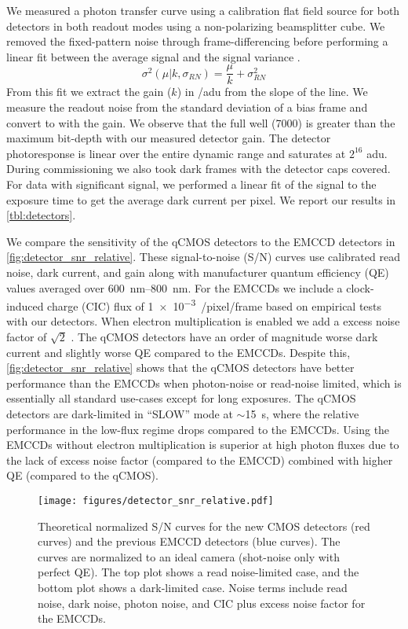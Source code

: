 We measured a photon transfer curve using a calibration flat field source for both detectors in both readout modes using a non-polarizing beamsplitter cube. We removed the fixed-pattern noise through frame-differencing before performing a linear fit between the average signal and the signal variance \citep{stefanov_cmos_2022}. 
\begin{equation}
    \sigma^2\left(\mu | k, \sigma_{RN}\right) = \frac{\mu}{k} + \sigma^2_{RN}
\end{equation}
From this fit we extract the gain ($k$) in \si{\electron/adu} from the slope of the line. We measure the readout noise from the standard deviation of a bias frame and convert to \si{\electron} with the gain. We observe that the full well (\SI{7000}{\electron}) is greater than the maximum bit-depth with our measured detector gain. The detector photoresponse is linear over the entire dynamic range and saturates at $2^{16}$ \si{adu}. During commissioning we also took dark frames with the detector caps covered. For data with significant signal, we performed a linear fit of the signal to the exposure time to get the average dark current per pixel. We report our results in \autoref{tbl:detectors}.

We compare the sensitivity of the qCMOS detectors to the EMCCD detectors in \autoref{fig:detector_snr_relative}. These signal-to-noise (S/N) curves use calibrated read noise, dark current, and gain along with manufacturer quantum efficiency (QE) values averaged over \SIrange{600}{800}{nm}. For the EMCCDs we include a clock-induced charge (CIC) flux of \SI{1e-3}{\electron/pixel/frame} based on empirical tests with our detectors. When electron multiplication is enabled we add a excess noise factor of $\sqrt{2}$ \citep{harpsoe_bayesian_2012}. The qCMOS detectors have an order of magnitude worse dark current and slightly worse QE compared to the EMCCDs. Despite this, \autoref{fig:detector_snr_relative} shows that the qCMOS detectors have better performance than the EMCCDs when photon-noise or read-noise limited, which is essentially all standard use-cases except for long exposures. The qCMOS detectors are dark-limited in ``SLOW'' mode at $\sim$\SI{15}{s}, where the relative performance in the low-flux regime drops compared to the EMCCDs. Using the EMCCDs without electron multiplication is superior at high photon fluxes due to the lack of excess noise factor (compared to the EMCCD) combined with higher QE (compared to the qCMOS).

\begin{figure}
    \centering
    \texttt{[image: figures/detector\_snr\_relative.pdf]}
    \caption{Theoretical normalized S/N curves for the new CMOS detectors (red curves) and the previous EMCCD detectors (blue curves). The curves are normalized to an ideal camera (shot-noise only with perfect QE). The top plot shows a read noise-limited case, and the bottom plot shows a dark-limited case. Noise terms include read noise, dark noise, photon noise, and CIC plus excess noise factor for the EMCCDs.\label{fig:detector_snr_relative}}
\end{figure}

